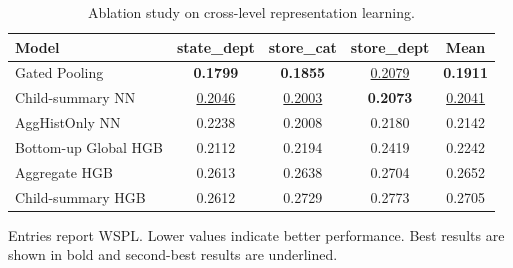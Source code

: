 \begin{table}[H]
\centering
\caption{Ablation study on cross-level representation learning.}
\label{tab:ablation}
\begin{threeparttable}
\begin{tabular}{lcccc}
\toprule
Model & state\_dept & store\_cat & store\_dept & Mean \\
\midrule
Gated Pooling & \textbf{0.1799} & \textbf{0.1855} & \underline{0.2079} & \textbf{0.1911} \\
Child-summary NN & \underline{0.2046} & \underline{0.2003} & \textbf{0.2073} & \underline{0.2041} \\
AggHistOnly NN & 0.2238 & 0.2008 & 0.2180 & 0.2142 \\
Bottom-up Global HGB & 0.2112 & 0.2194 & 0.2419 & 0.2242 \\
Aggregate HGB & 0.2613 & 0.2638 & 0.2704 & 0.2652 \\
Child-summary HGB & 0.2612 & 0.2729 & 0.2773 & 0.2705 \\
\bottomrule
\end{tabular}
\begin{tablenotes}
\footnotesize \item Entries report WSPL. Lower values indicate better performance. Best results are shown in bold and second-best results are underlined.
\end{tablenotes}
\end{threeparttable}
\end{table}
